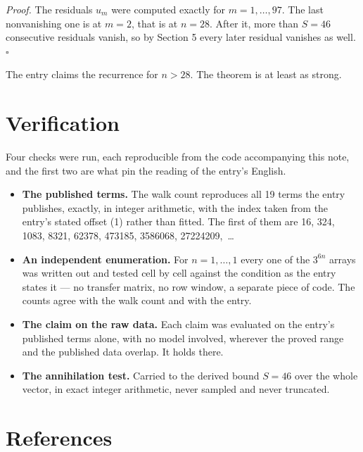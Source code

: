 \documentclass[11pt]{article}
\theoremstyle{definition}
\begin{document}
{\itshape Proof.} The residuals $u_m$ were computed exactly for $m = 1,\dots,97$. The last nonvanishing one is at $m = 2$, that is at $n = 28$. After it, more than $S = 46$ consecutive residuals vanish, so by Section 5 every later residual vanishes as well. $\square$

The entry claims the recurrence for $n > 28$. The theorem is at least as strong.

\section{Verification}

Four checks were run, each reproducible from the code accompanying this note, and the first two are what pin the reading of the entry's English.

\begin{itemize}

\item {\bfseries The published terms.} The walk count reproduces all 19 terms the entry publishes, exactly, in integer arithmetic, with the index taken from the entry's stated offset (1) rather than fitted. The first of them are 16, 324, 1083, 8321, 62378, 473185, 3586068, 27224209,~\dots

\item {\bfseries An independent enumeration.} For $n = 1,\dots,1$ every one of the $3^{6n}$ arrays was written out and tested cell by cell against the condition as the entry states it --- no transfer matrix, no row window, a separate piece of code. The counts agree with the walk count and with the entry.

\item {\bfseries The claim on the raw data.} Each claim was evaluated on the entry's published terms alone, with no model involved, wherever the proved range and the published data overlap. It holds there.

\item {\bfseries The annihilation test.} Carried to the derived bound $S = 46$ over the whole vector, in exact integer arithmetic, never sampled and never truncated.

\end{itemize}

\section{References}
\end{document}
